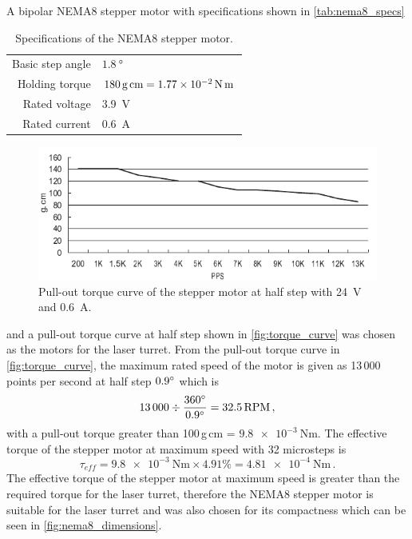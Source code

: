 A bipolar NEMA8 stepper motor with specifications shown in \autoref{tab:nema8_specs}
\begin{table}[!htb]
  \centering
  \begin{tabular}{rl}
    \hline
    Basic step angle & $\SI{1.8}{\degree}$                               \\
    Holding torque   & $180\,\text{g\,cm} = \SI{1.77e-2}{\newton\meter}$ \\
    Rated voltage    & 3.9~V                                             \\
    Rated current    & 0.6~A                                             \\
    \hline
  \end{tabular}
  \caption{Specifications of the NEMA8 stepper motor.}
  \label{tab:nema8_specs}
\end{table}
\begin{figure}[!htb]
  \centering
  \includegraphics[width=\textwidth]{figures/hardware_design/torque_curve.pdf}
  \caption{Pull-out torque curve of the stepper motor at half step with 24~V and 0.6~A.}
  \label{fig:torque_curve}
\end{figure}
and a pull-out torque curve at half step shown in \autoref{fig:torque_curve} was chosen as the motors for the laser turret. From the pull-out torque curve in \autoref{fig:torque_curve}, the maximum rated speed of the motor is given as 13\,000 points per second at half step $0.9^{\circ}$ which is
\begin{equation}
  \num{13000} \div \frac{360^{\circ}}{0.9^{\circ}} = 32.5\,\text{RPM}\,,
\end{equation}
with a pull-out torque greater than 100\,g\,cm = $\SI{9.8e-3}{\newton\meter}
$. The effective torque of the stepper motor at maximum speed with 32 microsteps is
\begin{equation}
  \tau_{eff} = \SI{9.8e-3}{\newton\meter} \times 4.91\% = \SI{4.81e-4}{\newton\meter}\,.
\end{equation}
The effective torque of the stepper motor at maximum speed is greater than the required torque for the laser turret, therefore the NEMA8 stepper motor is suitable for the laser turret and was also chosen for its compactness which can be seen in \autoref{fig:nema8_dimensions}.
